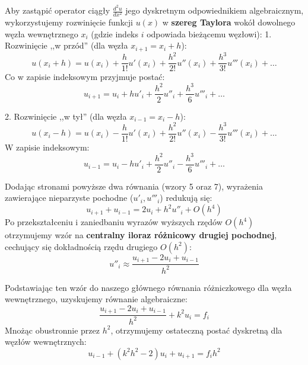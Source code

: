 \documentclass[a4paper,14pt]{scrartcl}
\begin{document}
Aby zastąpić operator ciągły $\frac{d^2u}{dx^2}$ jego dyskretnym odpowiednikiem algebraicznym, wykorzystujemy rozwinięcie funkcji $u(x)$ w \textbf{szereg Taylora} wokół dowolnego węzła wewnętrznego $x_i$ (gdzie indeks $i$ odpowiada bieżącemu węzłowi):
1. Rozwinięcie ,,w przód'' (dla węzła $x_{i+1} = x_i + h$):
\begin{equation}
    u(x_i + h) = u(x_i) + \frac{h}{1!}u'(x_i) + \frac{h^2}{2!}u''(x_i) + \frac{h^3}{3!}u'''(x_i) + \dots
\end{equation}
Co w zapisie indeksowym przyjmuje postać:
\begin{equation}
    u_{i+1} = u_i + h u'_i + \frac{h^2}{2} u''_i + \frac{h^3}{6} u'''_i + \dots
\end{equation}

2. Rozwinięcie ,,w tył'' (dla węzła $x_{i-1} = x_i - h$):
\begin{equation}
    u(x_i - h) = u(x_i) - \frac{h}{1!}u'(x_i) + \frac{h^2}{2!}u''(x_i) - \frac{h^3}{3!}u'''(x_i) + \dots
\end{equation}
W zapisie indeksowym:
\begin{equation}
    u_{i-1} = u_i - h u'_i + \frac{h^2}{2} u''_i - \frac{h^3}{6} u'''_i + \dots
\end{equation}

Dodając stronami powyższe dwa równania (wzory 5 oraz 7), wyrażenia zawierające nieparzyste pochodne ($u'_i, u'''_i$) redukują się:
\begin{equation}
    u_{i+1} + u_{i-1} = 2u_i + h^2 u''_i + O(h^4)
\end{equation}
Po przekształceniu i zaniedbaniu wyrazów wyższych rzędów $O(h^4)$ otrzymujemy wzór na \textbf{centralny iloraz różnicowy drugiej pochodnej}, cechujący się dokładnością rzędu drugiego $O(h^2)$:
\begin{equation}
    u''_i \approx \frac{u_{i+1} - 2u_i + u_{i-1}}{h^2}
\end{equation}

Podstawiając ten wzór do naszego głównego równania różniczkowego dla węzła wewnętrznego, uzyskujemy równanie algebraiczne:
\begin{equation}
    \frac{u_{i+1} - 2u_i + u_{i-1}}{h^2} + k^2 u_i = f_i
\end{equation}
Mnożąc obustronnie przez $h^2$, otrzymujemy ostateczną postać dyskretną dla węzłów wewnętrznych:
\begin{equation}
    u_{i-1} + (k^2h^2 - 2)u_i + u_{i+1} = f_i h^2
\end{equation}
\end{document}
